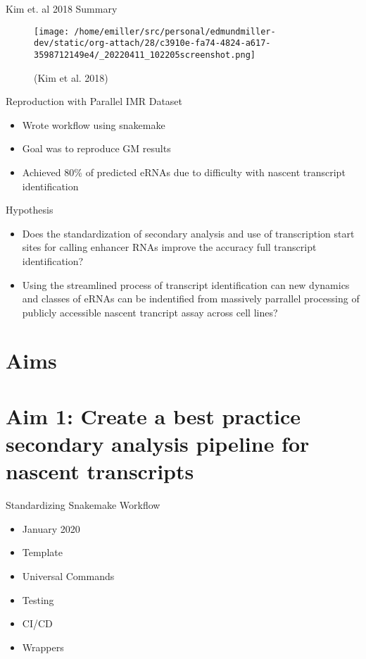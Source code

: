 \documentclass[bigger]{beamer}
\begin{document}
\begin{frame}[label={sec:org31dd82c}]{Kim et. al 2018 Summary}
\begin{figure}[htbp]
\centering
\texttt{[image: /home/emiller/src/personal/edmundmiller-dev/static/org-attach/28/c3910e-fa74-4824-a617-3598712149e4/\_20220411\_102205screenshot.png]}
\caption[Short caption]{(Kim et al. 2018)}
\end{figure}
\end{frame}

\begin{frame}[label={sec:orgd236887}]{Reproduction with Parallel IMR Dataset}
\begin{itemize}
\item Wrote workflow using snakemake
\item Goal was to reproduce GM results
\item Achieved \alert{80\%} of predicted eRNAs due to difficulty with nascent transcript
identification
\end{itemize}
\end{frame}

\begin{frame}[label={sec:org5ba254e}]{Hypothesis}
\begin{itemize}
\item Does the standardization of secondary analysis and use of transcription start
sites for calling enhancer RNAs improve the accuracy full transcript
identification?
\item Using the streamlined process of transcript identification can new dynamics
and classes of eRNAs can be indentified from massively parrallel processing of
publicly accessible nascent trancript assay across cell lines?
\end{itemize}
\end{frame}
\section*{Aims}
\label{sec:org9eff12c}
\section*{Aim 1: Create a best practice secondary analysis pipeline for nascent transcripts}
\label{sec:org25732fe}
\begin{frame}[label={sec:org061865d}]{Standardizing Snakemake Workflow}
\begin{itemize}
\item January 2020
\item Template
\item Universal Commands
\item Testing
\item CI/CD
\item Wrappers
\end{itemize}
\end{frame}
\end{document}
